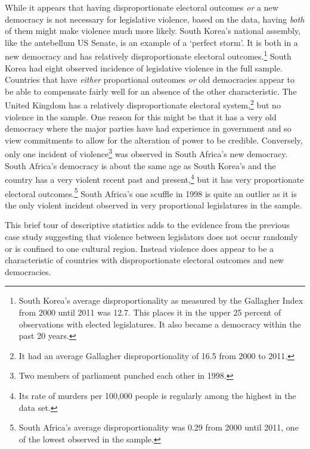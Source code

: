 \documentclass[a4paper]{article}\usepackage[]{graphicx}\usepackage[]{color}
\begin{document}
While it appears that having disproportionate electoral outcomes \emph{or} a new democracy is not necessary for legislative violence, based on the data, having \emph{both} of them might make violence much more likely. South Korea's national assembly, like the antebellum US Senate, is an example of a `perfect storm'. It is both in a new democracy and has relatively disproportionate electoral outcomes.\footnote{South Korea’s average disproportionality as measured by the Gallagher Index \citep{Gallagher1991} from 2000 until 2011 was 12.7. This places it in the upper 25 percent of observations with elected legislatures. It also became a democracy within the past 20 years.} South Korea had eight observed incidence of legislative violence in the full sample. Countries that have \emph{either} proportional outcomes \emph{or} old democracies appear to be able to compensate fairly well for an absence of the other characteristic. The United Kingdom has a relatively disproportionate electoral system,\footnote{It had an average Gallagher disproportionality of 16.5 from 2000 to 2011.} but no violence in the sample. One reason for this might be that it has a very old democracy where the major parties have had experience in government and so view commitments to allow for the alteration of power to be credible. Conversely, only one incident of violence\footnote{Two members of parliament punched each other in 1998.} was observed in South Africa's new democracy. South Africa's democracy is about the same age as South Korea's and the country has a very violent recent past and present,\footnote{Its rate of murders per 100,000 people is regularly among the highest in the \cite{UNMurder2013} data set.} but it has very proportionate electoral outcomes.\footnote{South Africa’s average disproportionality was 0.29 from 2000 until 2011, one of the lowest observed in the sample.} South Africa's one scuffle in 1998 is quite an outlier as it is the only violent incident observed in very proportional legislatures in the sample.

This brief tour of descriptive statistics adds to the evidence from the previous case study suggesting that violence between legislators does not occur randomly or is confined to one cultural region. Instead violence does appear to be a characteristic of countries with disproportionate electoral outcomes and new democracies.
\end{document}
